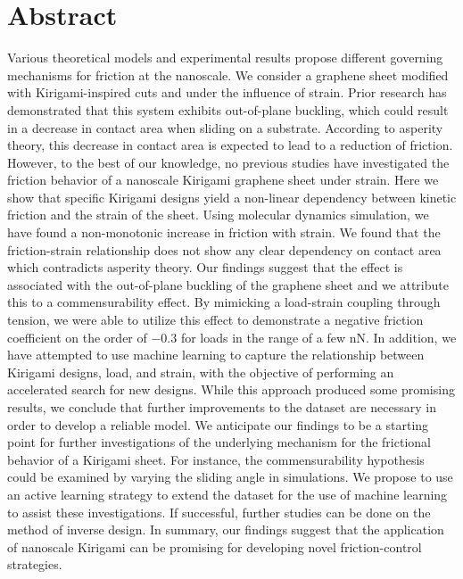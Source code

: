 \chapter*{Abstract} 


Various theoretical models and experimental results propose different governing
mechanisms for friction at the nanoscale. We consider a graphene sheet modified
with Kirigami-inspired cuts and under the influence of strain. Prior research
has demonstrated that this system exhibits out-of-plane buckling, which could
result in a decrease in contact area when sliding on a substrate. According to
asperity theory, this decrease in contact area is expected to lead to a
reduction of friction. However, to the best of our knowledge, no previous
studies have investigated the friction behavior of a nanoscale Kirigami graphene
sheet under strain. Here we show that specific Kirigami designs yield a
non-linear dependency between kinetic friction and the strain of the sheet.
Using molecular dynamics simulation, we have found a non-monotonic increase in
friction with strain. We found that the friction-strain relationship does not
show any clear dependency on contact area which contradicts asperity theory. Our
findings suggest that the effect is associated with the out-of-plane buckling of
the graphene sheet and we attribute this to a commensurability effect. By
mimicking a load-strain coupling through tension, we were able to utilize this
effect to demonstrate a negative friction coefficient on the order of $-0.3$ for
loads in the range of a few nN. In addition, we have attempted to use machine
learning to capture the relationship between Kirigami designs, load, and strain,
with the objective of performing an accelerated search for new designs. While
this approach produced some promising results, we conclude that further
improvements to the dataset are necessary in order to develop a reliable model.
We anticipate our findings to be a starting point for further investigations of
the underlying mechanism for the frictional behavior of a Kirigami sheet. For
instance, the commensurability hypothesis could be examined by varying the
sliding angle in simulations. We propose to use an active learning strategy to
extend the dataset for the use of machine learning to assist these
investigations. If successful, further studies can be done on the method of
inverse design. In summary, our findings suggest that the application of
nanoscale Kirigami can be promising for developing novel friction-control
strategies.
